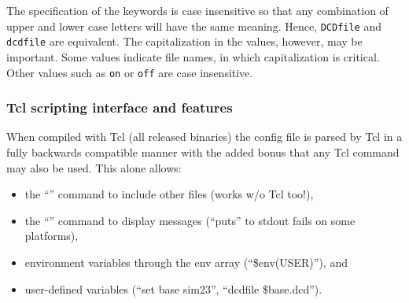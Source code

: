 The specification of the keywords is case insensitive 
so that any combination of 
upper and lower case letters will have the same meaning.  
Hence, {\tt DCDfile} and {\tt dcdfile} 
are equivalent.  The capitalization in the values, however, may be important.
Some values indicate file names, in which capitalization is critical.  
Other values such as {\tt on} or {\tt off} are case insensitive.

\subsubsection{Tcl scripting interface and features}
\label{section:tclscripting}

When compiled with Tcl (all released binaries) the config file
is parsed by Tcl in a fully backwards compatible manner with the
added bonus that any Tcl command may also be used.  This alone allows:
\begin{itemize}
 \item the ``'' command to include other files (works w/o Tcl too!),
 \item the ``'' command to display messages (``puts'' to stdout fails on some platforms),
 \item environment variables through the env array (``\$env(USER)''), and
 \item user-defined variables (``set base sim23'', ``dcdfile \${base}.dcd'').
\end{itemize}

